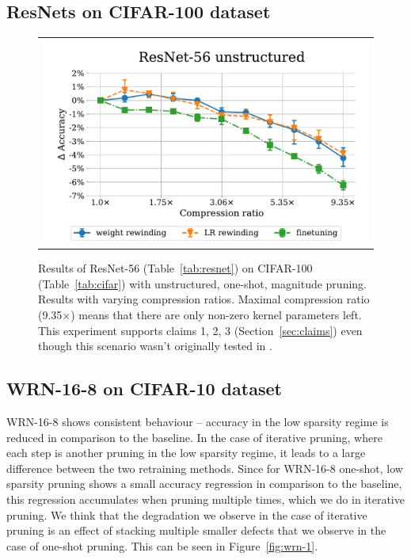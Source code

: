 \subsection{ResNets on CIFAR-100 dataset}
\nopagebreak
\begin{figure}[H]
\setlength{\tabcolsep}{0pt}
\centering
    \begin{tabular}{c}
      \includegraphics[width=0.7\linewidth]{pics/Resnet56-C100.pdf}
    \end{tabular}
\caption{Results of ResNet-56 (Table~\ref{tab:resnet}) on CIFAR-100 (Table~\ref{tab:cifar}) with unstructured, one-shot, magnitude pruning. Results with varying compression ratios. Maximal compression ratio (9.35$\times$) means that there are only  non-zero kernel parameters left. This experiment supports claims 1, 2, 3 (Section~\ref{sec:claims}) even though this scenario wasn't originally tested in \cite{Renda}.}
\label{fig:resnet56-2}
\end{figure}

\subsection{WRN-16-8 on CIFAR-10 dataset}
\nopagebreak

WRN-16-8 shows consistent behaviour -- accuracy in the low sparsity regime is reduced in comparison to the baseline. In the case of iterative pruning, where each step is another pruning in the low sparsity regime, it leads to a large difference between the two retraining methods. Since for WRN-16-8 one-shot, low sparsity pruning shows a small accuracy regression in comparison to the baseline, this regression accumulates when pruning multiple times, which we do in iterative pruning. We think that the degradation we observe in the case of iterative pruning is an effect of stacking multiple smaller defects that we observe in the case of one-shot pruning. This can be seen in Figure~\ref{fig:wrn-1}.

